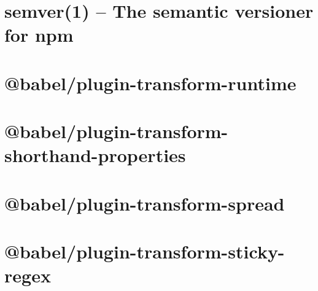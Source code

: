 \documentclass[twoside]{book}
\newcommand{\+}{\discretionary{\mbox{\scriptsize$\hookleftarrow$}}{}{}}
\begin{document}
\chapter{semver(1) -- The semantic versioner for npm}
\label{md__c___users_vaishnavi_jadhav__desktop__developer_code_mean_stack_example_client_node_modules__c8830abda03c8c6551f49e416ff78d9b}

\chapter{@babel/plugin-\/transform-\/runtime}
\label{md__c___users_vaishnavi_jadhav__desktop__developer_code_mean_stack_example_client_node_modules__f4b3eedc6ed7859974dce6178e24c960}

\chapter{@babel/plugin-\/transform-\/shorthand-\/properties}
\label{md__c___users_vaishnavi_jadhav__desktop__developer_code_mean_stack_example_client_node_modules__d67dcc2e58da19863ffffbfc3d4aff4b}

\chapter{@babel/plugin-\/transform-\/spread}
\label{md__c___users_vaishnavi_jadhav__desktop__developer_code_mean_stack_example_client_node_modules__1962b27d0cbbe137370394547d0de930}

\chapter{@babel/plugin-\/transform-\/sticky-\/regex}
\label{md__c___users_vaishnavi_jadhav__desktop__developer_code_mean_stack_example_client_node_modules__91408f6f2c224e35ee4ac1c6749d61f3}

\end{document}
